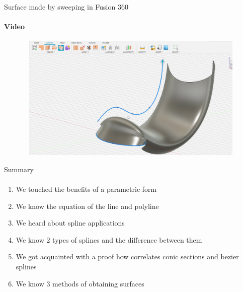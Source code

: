 \documentclass[aspectratio=169]{beamer}
\begin{document}
\begin{frame}[t]{Surface made by sweeping in Fusion 360}
    \framesubtitle{Video}
    \vspace{-0.6cm}
    \begin{figure}[H]
        \href{run:./videos/sweep_surface_video.mp4}{
            \centering\includegraphics[height=6cm,width=1\textwidth,keepaspectratio]{sweep_surface_video_preview.jpg}}
    \end{figure}
\end{frame}

\begin{frame}[t]{Summary}
\framesubtitle{}
\begin{enumerate}
    \item We touched the benefits of a parametric form
    \pause
    \item We know the equation of the line and polyline
    \pause
    \item We heard about spline applications
    \pause
    \item We know 2 types of splines and the difference between them
    \pause
    \item We got acquainted with a proof how correlates conic sections and bezier splines
    \item We know 3 methods of obtaining surfaces
\end{enumerate}

\end{frame}
\end{document}
